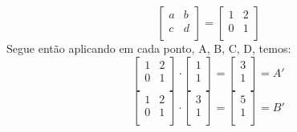 \documentclass[english,ngerman,parskip=half]{scrartcl}
\begin{document}
\begin{enumerate}
\begin{enumerate}
\begin{equation}
\begin{bmatrix}
                a & b \\
                c & d \\
                \end{bmatrix}
                =
                \begin{bmatrix}
                1 & 2 \\
                0 & 1 \\
                \end{bmatrix}
            \end{equation}
            Segue então aplicando em cada ponto, A, B, C, D, temos: 
            \begin{equation}
                \begin{bmatrix}
                1 & 2 \\
                0 & 1 \\
                \end{bmatrix}
                \cdot
                \begin{bmatrix}
                1 \\
                1 \\
                \end{bmatrix}
                =
                \begin{bmatrix}
                3 \\
                1 \\
                \end{bmatrix}
                 = A'
            \end{equation}
            \begin{equation}
                \begin{bmatrix}
                1 & 2 \\
                0 & 1 \\
                \end{bmatrix}
                \cdot
                \begin{bmatrix}
                3 \\
                1 \\
                \end{bmatrix}
                =
                \begin{bmatrix}
                5 \\
                1 \\
                \end{bmatrix}
                = B'
            \end{equation}

\end{enumerate}
\end{enumerate}
\end{document}
